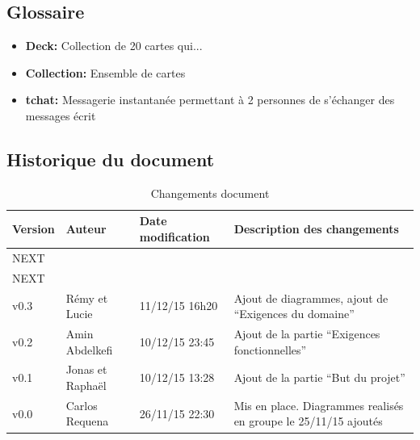 \documentclass[11pt,a4paper]{article}
\begin{document}
\subsection{Glossaire}
\label{sec:glo}


\begin{itemize}
  \item \textbf{Deck:} Collection de 20 cartes qui...
  \item \textbf{Collection:} Ensemble de cartes
  \item \textbf{tchat:} Messagerie instantanée permettant à 2 personnes de s'échanger des messages écrit
\end{itemize}

\subsection{Historique du document}
\label{sec:hist}






\begin{table}[h]
  \centering
  \begin{tabular}[ht]{|l|l|l|p{18em}|}
    \hline

    \textbf{Version}
    & \textbf{Auteur}
    & \textbf{Date modification}
    & \textbf{Description des changements}\\ \hline \hline
    NEXT &  &  &  \\ \hline
    NEXT &  &  &  \\ \hline
    v0.3 & Rémy et Lucie  & 11/12/15 16h20 & Ajout de diagrammes, ajout de ``Exigences du domaine'' \\ \hline
    v0.2 & Amin Abdelkefi & 10/12/15 23:45 & Ajout de la partie ``Exigences fonctionnelles''\\ \hline
    v0.1 & Jonas et Raphaël & 10/12/15 13:28 & Ajout de la partie ``But du projet''\\ \hline
    v0.0 & Carlos Requena & 26/11/15 22:30 & Mis en place. Diagrammes realisés en groupe le 25/11/15 ajoutés\\ \hline
  \end{tabular}
  \caption{Changements document}
  \label{tab:hist}
\end{table}
\end{document}
